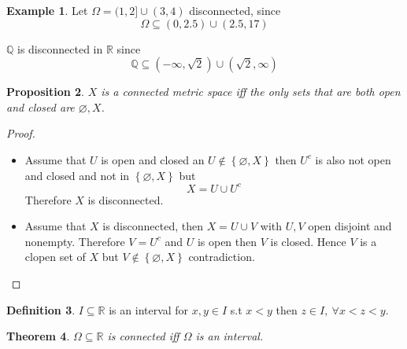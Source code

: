 \documentclass[11pt,a4paper]{article}
\theoremstyle{definition}
\newtheorem{definition}{Definition}[section]
\newtheorem{example}[definition]{Example}
\theoremstyle{plain}
\newtheorem{theorem}[definition]{Theorem}
\newtheorem{proposition}[definition]{Proposition}
\theoremstyle{remark}
\newcommand{\R}{\mathbb{R}}
\newcommand{\Q}{\mathbb{Q}}
\renewcommand{\set}[1]{\left\{ #1 \right\}}
\begin{document}
\begin{example}
    Let $\Omega = (1, 2] \cup (3,4)$ disconnected, since 
    $$\Omega \subseteq (0, 2.5) \cup (2.5, 17)$$

    $\Q$ is disconnected in $\R$ since 
    $$\Q \subseteq (-\infty, \sqrt{2}) \cup (\sqrt{2}, \infty)$$
\end{example}   

\begin{proposition}
    $X$ is a connected metric space iff the only sets that are both open and closed are $\varnothing, X$.  
\end{proposition}

\begin{proof}
    \begin{itemize}
        \item[$\implies$] Assume that $U$ is open and closed an $U \not\in \set{\varnothing, X}$ then $U^c$ is also not open and closed and not in $\set{\varnothing, X}$ but 
        $$X  = U \cup U^c$$
        Therefore $X$ is disconnected. 

        \item[$\impliedby$] Assume that $X$ is disconnected, then $X = U \cup V$ with $U, V$ open disjoint and nonempty. Therefore $V = U^c$ and $U$ is open 
        then $V$ is closed. Hence $V$ is a clopen set of $X$ but $V \not\in \set{\varnothing, X}$ contradiction. 
    \end{itemize}
\end{proof}

\begin{definition}
    $I \subseteq \R$ is an interval for $x, y \in I$ s.t $x < y$ then $z \in I, \ \forall x < z < y$. 
\end{definition}

\begin{theorem}
    $\Omega \subseteq \R$ is connected iff $\Omega$ is an interval. 
\end{theorem}
\end{document}
